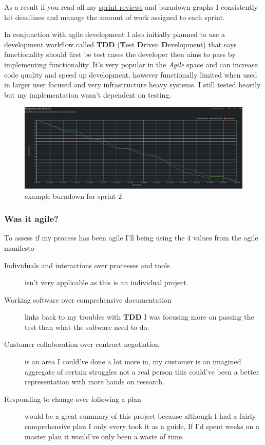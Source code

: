 As a result if you read all my \href{https://github.com/MrHarrisonBarker/CRPL/blob/main/README.md}{sprint reviews} and burndown graphs I consistently hit deadlines and manage the amount of work assigned to each sprint. 

In conjunction with agile development I also initially planned to use a development workflow called \textbf{TDD} (\textbf{T}est \textbf{D}riven \textbf{D}evelopment) that says functionality should first be test cases the developer then aims to pass by implementing functionality. It's very popular in the \textit{Agile} space and can increase code quality and speed up development, however functionally limited when used in larger user focused and very infrastructure heavy systems. I still tested heavily but my implementation wasn't dependent on testing.

\begin{figure}[H]
\caption{example burndown for sprint 2}
\centering
\includegraphics[width=\textwidth,height=\textheight,keepaspectratio]{images/burndown-2}
\end{figure}

\subsubsection{Was it agile?}

To assess if my process has been agile I'll being using the 4 values from the agile manifesto\cite{agile}

\begin{description}
	\item[Individuals and interactions over processes and tools] isn't very applicable as this is an individual project.
	\item[Working software over comprehensive documentation] links back to my troubles with \textbf{TDD} I was focusing more on passing the test than what the software need to do. 
	\item[Customer collaboration over contract negotiation] is an area I could've done a lot more in, my customer is an imagined aggregate of certain struggles not a real person this could've been a better representation with more hands on research.
	\item[Responding to change over following a plan] would be a great summary of this project because although I had a fairly comprehensive plan I only every took it as a guide, If I'd spent weeks on a master plan it would've only been a waste of time.
\end{description}

